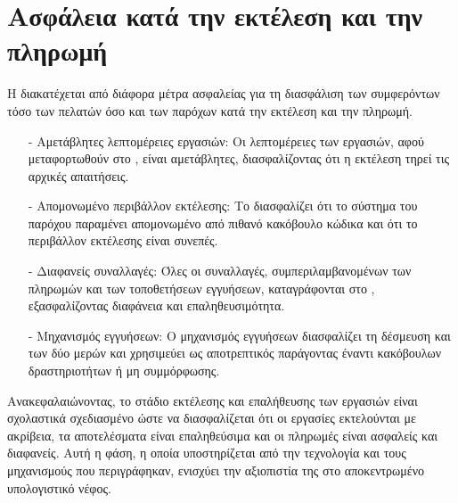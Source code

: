 \section{Ασφάλεια κατά την εκτέλεση και την πληρωμή}
Η  διακατέχεται από διάφορα μέτρα ασφαλείας για τη διασφάλιση των συμφερόντων τόσο των πελατών όσο και των παρόχων κατά την εκτέλεση και την πληρωμή.
\begin{itemize}
    \item[-] Αμετάβλητες λεπτομέρειες εργασιών: Οι λεπτομέρειες των εργασιών, αφού μεταφορτωθούν στο , είναι αμετάβλητες, διασφαλίζοντας ότι η εκτέλεση τηρεί τις αρχικές απαιτήσεις.
    \item[-] Απομονωμένο περιβάλλον εκτέλεσης: Το  διασφαλίζει ότι το σύστημα του παρόχου παραμένει απομονωμένο από πιθανό κακόβουλο κώδικα και ότι το περιβάλλον εκτέλεσης είναι συνεπές. 
    \item[-] Διαφανείς συναλλαγές: Όλες οι συναλλαγές, συμπεριλαμβανομένων των πληρωμών και των τοποθετήσεων εγγυήσεων, καταγράφονται στο , εξασφαλίζοντας διαφάνεια και επαληθευσιμότητα.
    \item[-] Μηχανισμός εγγυήσεων:  Ο μηχανισμός εγγυήσεων διασφαλίζει τη δέσμευση και των δύο μερών και χρησιμεύει ως αποτρεπτικός παράγοντας έναντι κακόβουλων δραστηριοτήτων ή μη συμμόρφωσης.
\end{itemize}


Ανακεφαλαιώνοντας, το στάδιο εκτέλεσης και επαλήθευσης των εργασιών είναι σχολαστικά σχεδιασμένο ώστε να διασφαλίζεται ότι οι εργασίες εκτελούνται με ακρίβεια, τα αποτελέσματα είναι επαληθεύσιμα και οι πληρωμές είναι ασφαλείς και διαφανείς. Αυτή η φάση, η οποία υποστηρίζεται από την τεχνολογία  και τους μηχανισμούς που περιγράφηκαν, ενισχύει την αξιοπιστία της  στο αποκεντρωμένο υπολογιστικό νέφος.
